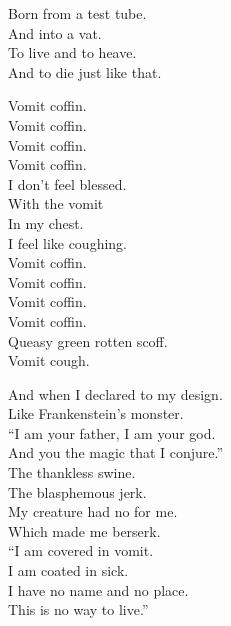 Born from a test tube. \\
And into a vat. \\
To live and to heave. \\
And to die just like that. \\





Vomit coffin. \\
Vomit coffin. \\
Vomit coffin. \\
Vomit coffin. \\

I don't feel blessed. \\
With the vomit \\
In my chest. \\
I feel like coughing. \\

Vomit coffin. \\
Vomit coffin. \\
Vomit coffin. \\
Vomit coffin. \\

Queasy green rotten scoff. \\

Vomit cough. \\


And when I declared to my design. \\
Like Frankenstein's monster. \\
``I am your father, I am your god. \\
And you the magic that I conjure.'' \\

The thankless swine. \\
The blasphemous jerk. \\
My creature had no  for me. \\
Which made me berserk. \\

``I am covered in vomit. \\
I am coated in sick. \\
I have no name and no place. \\
This is no way to live.'' \\

